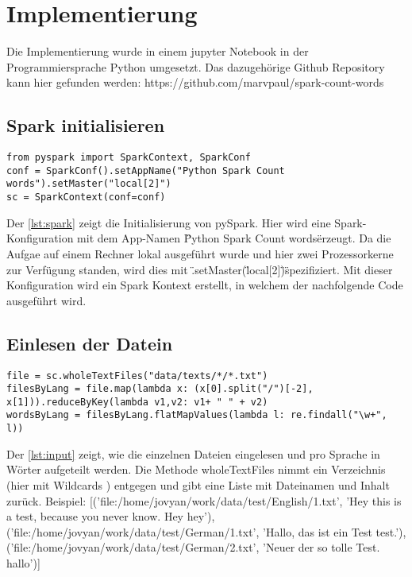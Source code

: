 \documentclass[chapterprefix=true, 12pt, a4paper, oneside, parskip=half, listof=totoc, bibliography=totoc, numbers=noendperiod]{scrbook}
\begin{document}
\section{Implementierung}

Die Implementierung wurde in einem jupyter Notebook in der Programmiersprache Python umgesetzt. Das dazugehörige Github Repository kann hier gefunden werden: https://github.com/marvpaul/spark-count-words
\subsection{Spark initialisieren}
\begin{lstlisting}[caption={Spark initialisieren}, captionpos=b, label={lst:spark}]
from pyspark import SparkContext, SparkConf
conf = SparkConf().setAppName("Python Spark Count words").setMaster("local[2]")
sc = SparkContext(conf=conf)   
\end{lstlisting}

Der  \autoref{lst:spark} zeigt die Initialisierung von pySpark. Hier wird eine Spark-Konfiguration mit dem App-Namen \"Python Spark Count words\" erzeugt. Da die Aufgae auf einem Rechner lokal ausgeführt wurde und hier zwei Prozessorkerne zur Verfügung standen, wird dies mit \".setMaster(\"local[2]\")\" spezifiziert. Mit dieser Konfiguration wird ein Spark Kontext erstellt, in welchem der nachfolgende Code ausgeführt wird.
\subsection{Einlesen der Datein}

\begin{lstlisting}[caption={Daten einlesen}, captionpos=b, label={lst:input}]
file = sc.wholeTextFiles("data/texts/*/*.txt")
filesByLang = file.map(lambda x: (x[0].split("/")[-2], x[1])).reduceByKey(lambda v1,v2: v1+ " " + v2)
wordsByLang = filesByLang.flatMapValues(lambda l: re.findall("\w+", l))
\end{lstlisting}

Der \autoref{lst:input} zeigt, wie die einzelnen Dateien eingelesen und pro Sprache in Wörter aufgeteilt werden. 
Die Methode  wholeTextFiles nimmt ein Verzeichnis (hier mit Wildcards \*) entgegen und gibt eine Liste mit Dateinamen und Inhalt zurück. 
Beispiel: [('file:/home/jovyan/work/data/test/English/1.txt',
  'Hey this is a test, because you never know. Hey hey'),
 ('file:/home/jovyan/work/data/test/German/1.txt',
  'Hallo, das ist ein Test test.'),
 ('file:/home/jovyan/work/data/test/German/2.txt',
  'Neuer der so tolle Test. hallo')]
  
\end{document}
